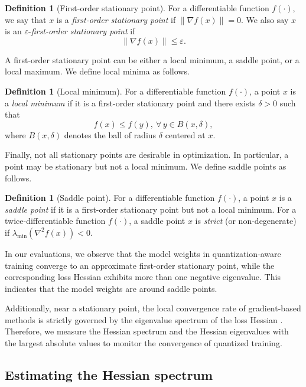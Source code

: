 \documentclass{article}
\theoremstyle{definition}
\newtheorem{definition}[theorem]{Definition}
\newcommand{\bignorm}[1]{\left\| #1 \right\|}
\begin{document}
\begin{definition}[First-order stationary point]
For a differentiable function $f(\cdot)$, we say that $x$ is a 
\emph{first-order stationary point} if $\|\nabla f(x)\| = 0$. 
We also say $x$ is an $\varepsilon$-\emph{first-order stationary point} 
if
\[
\bignorm{\nabla f(x)} \leq \varepsilon.
\]
\end{definition}
A first-order stationary point can be either a local
minimum, a saddle point, or a local maximum. We define local minima as follows.

\begin{definition}[Local minimum]
For a differentiable function $f(\cdot)$, a point $x$ is a 
\emph{local minimum} if it is a first-order stationary point and there exists $\delta > 0$ such that 
\[
f(x) \leq f(y), ~ \forall\, y \in B(x, \delta),
\]
where $B(x, \delta)$ denotes the ball of radius $\delta$ centered at $x$.
\end{definition}
Finally, not all stationary points are desirable in optimization. In particular, a point may be stationary but not a local minimum. We define saddle points as follows.

\begin{definition}[Saddle point]
For a differentiable function $f(\cdot)$, a point $x$ is a 
\emph{saddle point} if it is a first-order stationary point 
but not a local minimum. 
For a twice-differentiable function $f(\cdot)$, 
a saddle point $x$ is \emph{strict} (or non-degenerate) if 
$\lambda_{\min}(\nabla^2 f(x)) < 0$.
\end{definition}

In our evaluations, we observe that the model weights in quantization-aware training converge to an approximate first-order stationary point, while the corresponding loss Hessian exhibits more than one negative eigenvalue. This indicates that the model weights are around saddle points.

Additionally, near a stationary point, the local convergence rate of gradient-based methods is strictly governed by the eigenvalue spectrum of the loss Hessian \citep{nesterov2018lectures}. Therefore, we measure the Hessian spectrum and the Hessian eigenvalues with the largest absolute values to monitor the convergence of quantized training. 








\subsection{Estimating the Hessian spectrum} \label{sec_slq}
\end{document}
